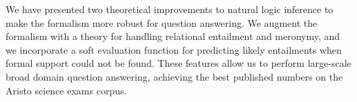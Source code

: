 We have presented two theoretical improvements to natural logic inference to
  make the formalism more robust for question answering.
We augment the formalism with a theory for handling relational entailment and meronymy,
  and we incorporate a soft evaluation function for predicting likely entailments when
  formal support could not be found.
These features allow us to perform large-scale broad domain question answering,
  achieving the best published numbers on the Aristo science exams corpus.

